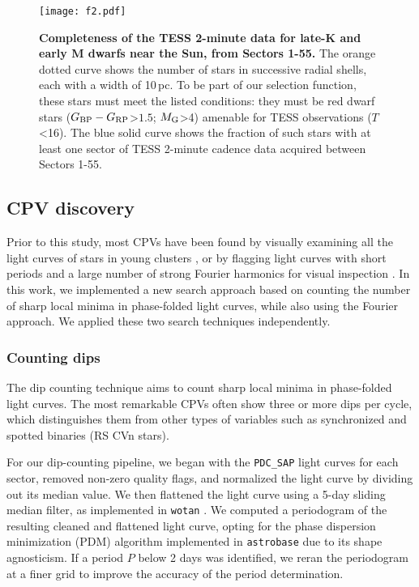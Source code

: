 \documentclass[11pt,twocolumn,tighten]{aastex63}
\newcommand{\bprp}{G_{\rm BP} - G_{\rm RP}}
\begin{document}
\begin{figure}[!t]
	\begin{center}
		\centering
		\texttt{[image: f2.pdf]}
		\vspace{-0.2cm}
		\caption{
			{\bf Completeness of the TESS 2-minute data for late-K
      and early M dwarfs near the Sun, from Sectors 1-55.}  
      The orange dotted curve shows the number of stars in successive
      radial shells, each with a width of 10\,pc.  To be part of our selection function,
      these stars must meet the listed conditions: they must be red dwarf
      stars
      ($\bprp$>$1.5$; $M_{\rm G}$>4) amenable for TESS
      observations ($T$<16).  The blue solid curve shows the fraction
      of such stars with at least one sector of TESS 2-minute cadence
      data acquired between Sectors 1-55.
		}
			\vspace{-0.5cm}
		\label{fig:completeness}
	\end{center}
\end{figure}



\subsection{CPV discovery}
\label{subsec:discoverymethods}

Prior to this study, most CPVs have been found by visually examining
all the light curves of stars in young clusters
\citep{2016AJ....152..114R,2017AJ....153..152S,2023ApJ...945..114P},
or by flagging light curves with short periods and a large number of
strong Fourier harmonics for visual inspection
\citep{2019ApJ...876..127Z}.  In this work, we implemented a new
search approach based on counting the number of sharp local minima in
phase-folded light curves, while also using the Fourier approach.  We
applied these two search techniques independently.


\subsubsection{Counting dips}
\label{subsec:counting}

The dip counting technique aims to count sharp local minima in
phase-folded light curves.  The most remarkable CPVs often show three
or more dips per cycle, which distinguishes them from other types of
variables such as synchronized and spotted binaries (RS CVn stars).

For our dip-counting pipeline, we began with the {\tt PDC\_SAP} light
curves for each sector, removed non-zero quality flags, and normalized
the light curve by dividing out its median value.  We then flattened
the light curve using a 5-day sliding median filter, as implemented in
\texttt{wotan} \citep{2019AJ....158..143H}.  We computed a periodogram
of the resulting cleaned and flattened light curve, opting for the
\citet{1978ApJ...224..953S} phase dispersion minimization (PDM)
algorithm implemented in \texttt{astrobase}
\citep{2021zndo...1011188B} due to its shape agnosticism.  If a period
$P$ below 2 days was identified, we reran the periodogram at a finer
grid to improve the accuracy of the period determination.
\end{document}
